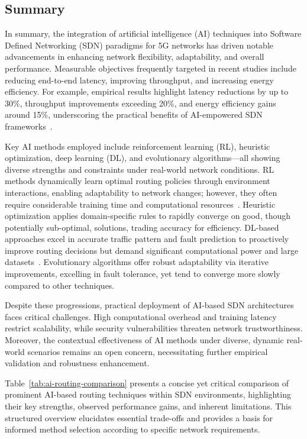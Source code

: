 \documentclass[sigconf]{acmart}
\begin{document}
\subsection{Summary}

In summary, the integration of artificial intelligence (AI) techniques into Software Defined Networking (SDN) paradigms for 5G networks has driven notable advancements in enhancing network flexibility, adaptability, and overall performance. Measurable objectives frequently targeted in recent studies include reducing end-to-end latency, improving throughput, and increasing energy efficiency. For example, empirical results highlight latency reductions by up to 30\%, throughput improvements exceeding 20\%, and energy efficiency gains around 15\%, underscoring the practical benefits of AI-empowered SDN frameworks~\cite{ref1,ref2}.

Key AI methods employed include reinforcement learning (RL), heuristic optimization, deep learning (DL), and evolutionary algorithms—all showing diverse strengths and constraints under real-world network conditions. RL methods dynamically learn optimal routing policies through environment interactions, enabling adaptability to network changes; however, they often require considerable training time and computational resources~\cite{ref1}. Heuristic optimization applies domain-specific rules to rapidly converge on good, though potentially sub-optimal, solutions, trading accuracy for efficiency. DL-based approaches excel in accurate traffic pattern and fault prediction to proactively improve routing decisions but demand significant computational power and large datasets~\cite{ref2}. Evolutionary algorithms offer robust adaptability via iterative improvements, excelling in fault tolerance, yet tend to converge more slowly compared to other techniques.

Despite these progressions, practical deployment of AI-based SDN architectures faces critical challenges. High computational overhead and training latency restrict scalability, while security vulnerabilities threaten network trustworthiness. Moreover, the contextual effectiveness of AI methods under diverse, dynamic real-world scenarios remains an open concern, necessitating further empirical validation and robustness enhancement.

Table~\ref{tab:ai-routing-comparison} presents a concise yet critical comparison of prominent AI-based routing techniques within SDN environments, highlighting their key strengths, observed performance gains, and inherent limitations. This structured overview elucidates essential trade-offs and provides a basis for informed method selection according to specific network requirements.
\end{document}
